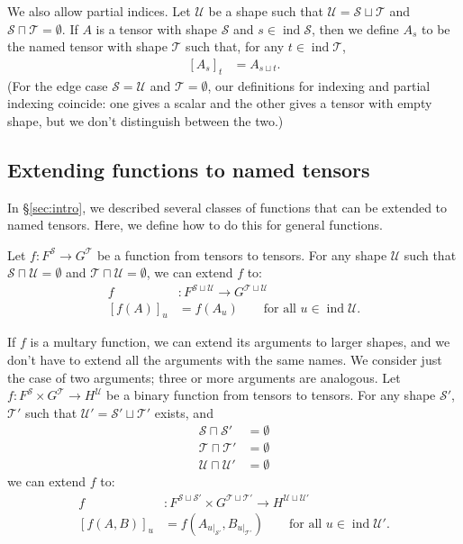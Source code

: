 \documentclass{article}
\DeclareMathOperator{\tupleshape}{ind}
\newcommand{\tuplerestrict}[2]{\left.#1\right|_{#2}}
\begin{document}
We also allow partial indices. Let $\mathcal{U}$ be a shape such that $\mathcal{U} = \mathcal{S} \sqcup \mathcal{T}$ and $\mathcal{S} \sqcap \mathcal{T} = \emptyset$.
If $A$ is a tensor with shape $\mathcal{S}$ and $s \in \tupleshape \mathcal{S}$, then we define $A_s$ to be the named tensor with shape $\mathcal{T}$ such that, for any $t \in \tupleshape \mathcal{T}$,
\begin{align*}
\left[A_s\right]_t &= A_{s \sqcup t}.
\end{align*}
(For the edge case $\mathcal{S} = \mathcal{U}$ and $\mathcal{T} = \emptyset$, our definitions for indexing and partial indexing coincide: one gives a scalar and the other gives a tensor with empty shape, but we don't distinguish between the two.)

\subsection{Extending functions to named tensors}
\label{sec:tensorfunctions}

In \S\ref{sec:intro}, we described several classes of functions that can be extended to named tensors. Here, we define how to do this for general functions.

Let $f \colon F^{\mathcal{S}} \rightarrow G^{\mathcal{T}}$ be a function from tensors to tensors. For any shape $\mathcal{U}$ such that $\mathcal{S} \sqcap \mathcal{U} = \emptyset$ and $\mathcal{T} \sqcap \mathcal{U} = \emptyset$, we can extend $f$ to:
\begin{align*}
f &: F^{\mathcal{S} \sqcup \mathcal{U}} \rightarrow G^{\mathcal{T} \sqcup \mathcal{U}} \\
[f(A)]_u &= f(A_u) \qquad \text{for all $u \in \tupleshape\mathcal{U}$.}
\end{align*}

If $f$ is a multary function, we can extend its arguments to larger shapes, and we don't have to extend all the arguments with the same names. We consider just the case of two arguments; three or more arguments are analogous. Let $f \colon F^{\mathcal{S}} \times G^{\mathcal{T}} \rightarrow H^{\mathcal{U}}$ be a binary function from tensors to tensors. For any shape $\mathcal{S'}$, $\mathcal{T'}$ such that $\mathcal{U'} = \mathcal{S'} \sqcup \mathcal{T'}$ exists, and 
\begin{align*}
\mathcal{S} \sqcap \mathcal{S'} &= \emptyset \\
\mathcal{T} \sqcap \mathcal{T'} &= \emptyset \\
\mathcal{U} \sqcap \mathcal{U'} &= \emptyset \end{align*}
we can extend $f$ to:
\begin{align*}
f &: F^{\mathcal{S} \sqcup \mathcal{S'}} \times G^{\mathcal{T} \sqcup \mathcal{T'}} \rightarrow H^{\mathcal{U} \sqcup \mathcal{U'}} \\
  [f(A,B)]_u &= f\left(A_{\tuplerestrict{u}{\mathcal{S'}}},B_{\tuplerestrict{u}{\mathcal{T'}}}\right) \qquad \text{for all $u \in \tupleshape\mathcal{U'}$.}
\end{align*}
\end{document}
